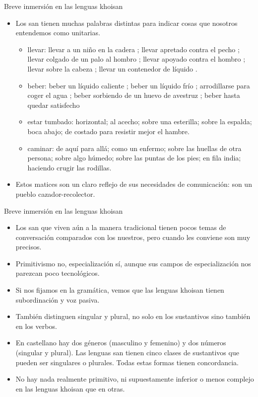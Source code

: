 \documentclass[handout]{beamer}
\begin{document}
\begin{frame}{Breve inmersión en las lenguas khoisan}
\begin{itemize}
	\item Los san tienen muchas palabras distintas para indicar cosas que nosotros entendemos como unitarias.
	\begin{itemize}
		\item llevar: llevar a un niño en la cadera \ipa{[|gâm]}; llevar apretado contra el pecho \ipa{[gàh'o]}; llevar colgado de un palo al hombro \ipa{[||gàlo]}; llevar apoyado contra el hombro \ipa{[!án]}; llevar sobre la cabeza \ipa{[!ú\~u //àm]}; llevar un contenedor de líquido \ipa{[//nùh\~a]}.
		\item beber: beber un líquido caliente \ipa{[sàm]}; beber un líquido frío \ipa{[qôm]}; arrodillarse para coger el agua \ipa{[//qàm]}; beber sorbiendo de un huevo de avestruz \ipa{[\!ogùmi]}; beber hasta quedar satisfecho \ipa{[d\=oh'o]}
		\item estar tumbado: horizontal; al acecho; sobre una esterilla; sobre la espalda; boca abajo; de costado para resistir mejor el hambre.
		\item caminar: de aquí para allá; como un enfermo; sobre las huellas de otra persona; sobre algo húmedo; sobre las puntas de los pies; en fila india; haciendo crugir las rodillas.
	\end{itemize}
	\item Estos matices son un claro reflejo de sus necesidades de comunicación: son un pueblo cazador-recolector. 
\end{itemize}

\end{frame}

\begin{frame}{Breve inmersión en las lenguas khoisan}
\begin{itemize}
	\item Los san que viven aún a la manera tradicional tienen pocos temas de conversación comparados con los nuestros, pero cuando les conviene son muy precisos.
	\item Primitivismo no, especialización sí, aunque sus campos de especialización nos parezcan poco tecnológicos.
	\item Si nos fijamos en la gramática, vemos que las lenguas khoisan tienen subordinación y voz pasiva.
	\item También distinguen singular y plural, no solo en los sustantivos sino también en los verbos.
	\item En castellano hay dos géneros (masculino y femenino) y dos números (singular y plural). Las lenguas san tienen cinco clases de sustantivos que pueden ser singulares o plurales. Todas estas formas tienen concordancia.
	\item No hay nada realmente primitivo, ni supuestamente inferior o menos complejo en las lenguas khoisan que en otras.
\end{itemize}

\end{frame}
\end{document}
